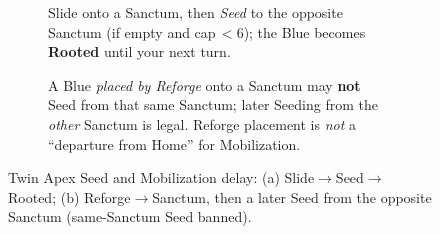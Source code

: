 \begin{figure}[H]
\begin{subfigure}[t]{0.48\linewidth}
    \caption{Slide onto a Sanctum, then \emph{Seed} to the opposite Sanctum (if empty and cap\,$<\!6$); the Blue becomes \textbf{Rooted} until your next turn.}
  \end{subfigure}
  \hfill
  \begin{subfigure}[t]{0.48\linewidth}
    \centering
    \hspace{6pt}

    \caption{A Blue \emph{placed by Reforge} onto a Sanctum may \textbf{not} Seed from that same Sanctum; later Seeding from the \emph{other} Sanctum is legal. Reforge placement is \emph{not} a ``departure from Home'' for Mobilization.}
  \end{subfigure}

  \caption{Twin Apex Seed and Mobilization delay: (a) Slide$\rightarrow$Seed$\rightarrow$Rooted; (b) Reforge$\rightarrow$Sanctum, then a later Seed from the opposite Sanctum (same-Sanctum Seed banned).}
  \label{fig:seed-mobilize}
\end{figure}

